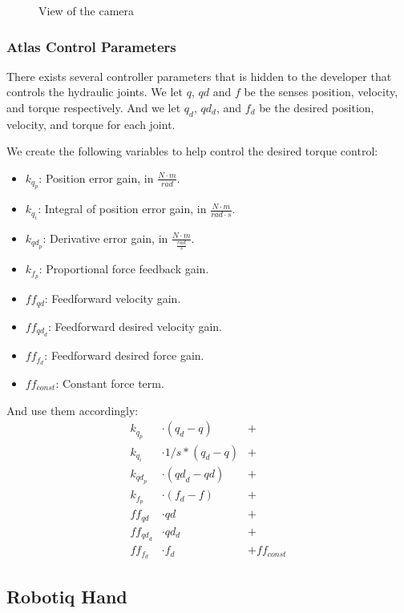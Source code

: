 \documentclass{article}
\begin{document}
\begin{figure}[ht]
\begin{center}
\begin{minipage}[b]{0.4\linewidth}
\caption{View of the camera}
\label{fig:figure2}
\end{minipage}
\end{center}
\end{figure}

\pagebreak


\subsubsection{Atlas Control Parameters}
There exists several controller parameters that is hidden to the developer that controls the hydraulic joints. We let $q$, $qd$ and $f$ be the senses position, velocity, and torque respectively. And we let $q_d$, $qd_d$, and $f_d$ be the desired position, velocity, and torque for each joint.

We create the following variables to help control the desired torque control:

\begin{itemize}
\item $k_{q_p}$: Position error gain, in $\frac{N \cdot m}{rad}$.
\item $k_{q_i} $: Integral of position error gain, in $\frac{N \cdot m}{rad \cdot s}$.
\item $k_{{qd}_p}$: Derivative error gain, in $\frac{N \cdot m}{\frac{rad}{s}}$.
\item $k_{f_p}$: Proportional force feedback gain.
\item ${ff}_{qd}$: Feedforward velocity gain.
\item ${ff}_{{qd}_d}$: Feedforward desired velocity gain.
\item ${ff}_{f_d}$: Feedforward desired force gain.
\item ${ff}_{const}$: Constant force term.
\end{itemize}

And use them accordingly: 
\begin{align*}
k_{q_p} &\cdot ( q_d - q ) &+\\
k_{q_i} &\cdot 1/s * ( q_d - q ) &+\\
k_{{qd}_p} &\cdot ( {qd}_d - qd ) &+\\
k_{f_p} &\cdot ( f_d - f ) &+\\
{ff}_{qd} &\cdot qd &+\\
{ff}_{{qd}_d} &\cdot qd_d &+\\
{ff}_{f_d} &\cdot f_d &+ {ff}_{const}
\end{align*}

\subsection{Robotiq Hand}
\end{document}
